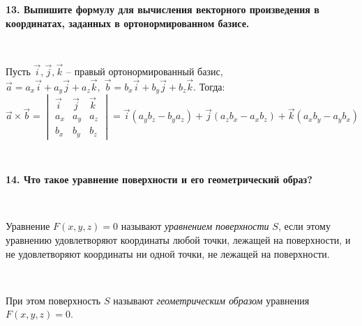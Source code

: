 \documentclass{article}
\begin{document}
    \newpage



    \textbf{13. Выпишите формулу для вычисления векторного произведения в координатах, заданных в ортонормированном базисе.}

    {
        $\;$
        \setlength{\parindent}{0.4cm}
        \hangindent=0.4cm

    Пусть $\overrightarrow{i}, \overrightarrow{j}, \overrightarrow{k}$ -- правый ортонормированный базис, $\overrightarrow{a}=a_x\overrightarrow{i}+a_y\overrightarrow{j}+a_z\overrightarrow{k}, \; \overrightarrow{b}=b_x\overrightarrow{i}+b_y\overrightarrow{j}+b_z\overrightarrow{k}$. Тогда: $$\overrightarrow{a}\times\overrightarrow{b}=\begin{vmatrix}
                                                                                                                                                                                                                                                                                                                                                   \overrightarrow{i} & \overrightarrow{j} & \overrightarrow{k} \\
                                                                                                                                                                                                                                                                                                                                                   a_x                & a_y                & a_z                \\
                                                                                                                                                                                                                                                                                                                                                   b_x                & b_y                & b_z
    \end{vmatrix}=\overrightarrow{i}(a_yb_z-b_ya_z)+\overrightarrow{j}(a_zb_x-a_xb_z)+\overrightarrow{k}(a_xb_y-a_yb_x)$$

        $\;$
        \setlength{\parindent}{0cm}
        \hangindent=0cm
    }


    \textbf{14. Что такое уравнение поверхности и его геометрический образ?}

    {
        $\;$
        \setlength{\parindent}{0.4cm}
        \hangindent=0.4cm

    Уравнение $F(x, y, z)=0$ называют \textit{уравнением поверхности} $S$, если этому уравнению удовлетворяют координаты любой точки, лежащей на поверхности, и не удовлетворяют координаты ни одной точки, не лежащей на поверхности.

        $\;$

        При этом поверхность $S$ называют \textit{геометрическим образом} уравнения $F(x, y, z)=0$.

        $\;$
        \setlength{\parindent}{0cm}
        \hangindent=0cm
    }
\end{document}
